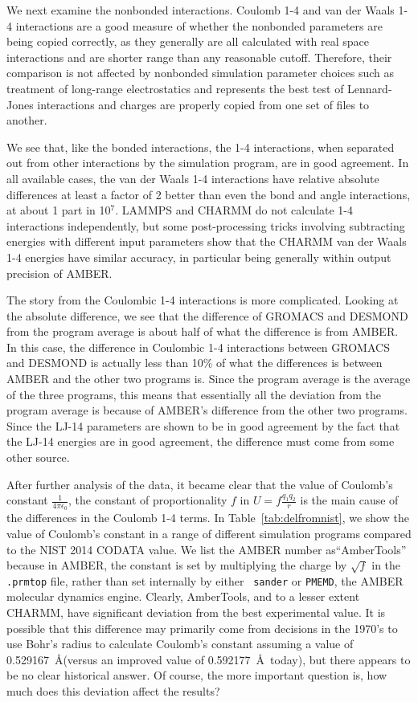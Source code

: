 We next examine the nonbonded interactions. Coulomb 1-4 and van der
Waals 1-4 interactions are a good measure of whether the nonbonded
parameters are being copied correctly, as they generally are all
calculated with real space interactions and are shorter range than any
reasonable cutoff. Therefore, their comparison is not affected by
nonbonded simulation parameter choices such as treatment of long-range
electrostatics and represents the best test of Lennard-Jones
interactions and charges are properly copied from one set of files to
another.

We see that, like the bonded interactions, the 1-4 interactions, when
separated out from other interactions by the simulation program, are
in good agreement.  In all available cases, the van der Waals 1-4
interactions have relative absolute differences at least a factor of 2
better than even the bond and angle interactions, at about 1 part in
10$^{7}$. LAMMPS and CHARMM do not calculate 1-4 interactions
independently, but some post-processing tricks involving subtracting
energies with different input parameters show that the CHARMM van der
Waals 1-4 energies have similar accuracy, in particular being
generally within output precision of AMBER.

The story from the Coulombic 1-4 interactions is more
complicated. Looking at the absolute difference, we see that the
difference of GROMACS and DESMOND from the program average is about
half of what the difference is from AMBER. In this case, the
difference in Coulombic 1-4 interactions between GROMACS and DESMOND
is actually less than 10\% of what the differences is between AMBER
and the other two programs is. Since the program average is the
average of the three programs, this means that essentially all the
deviation from the program average is because of AMBER's difference
from the other two programs. Since the LJ-14 parameters are shown to
be in good agreement by the fact that the LJ-14 energies are in good
agreement, the difference must come from some other source.

After further analysis of the data, it became clear that the value of
Coulomb's constant $\frac{1}{4 \pi \epsilon_0}$, the constant of
proportionality $f$ in $U = f\frac{q_1q_2}{r}$ is the main cause of
the differences in the Coulomb 1-4 terms. In
Table~\ref{tab:delfromnist}, we show the value of Coulomb's constant
in a range of different simulation programs compared to the NIST 2014
CODATA value.  We list the AMBER number as``AmberTools'' because in
AMBER, the constant is set by multiplying the charge by $\sqrt{f}$ in
the {\tt .prmtop} file, rather than set internally by either {\tt
  sander} or {\tt PMEMD}, the AMBER molecular dynamics engine.
Clearly, AmberTools, and to a lesser extent CHARMM, have significant
deviation from the best experimental value.  It is possible that this
difference may primarily come from decisions in the 1970's to use
Bohr's radius to calculate Coulomb's constant assuming a value of
0.529167~\AA (versus an improved value of 0.592177~\AA~today), but
there appears to be no clear historical answer.  Of course, the more
important question is, how much does this deviation affect the
results?

